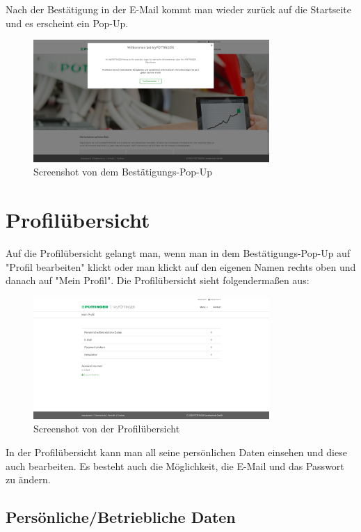 Nach der Bestätigung in der E-Mail kommt man wieder zurück auf die Startseite und es erscheint ein Pop-Up.

\begin{figure}[H]
	\centerline{
		\includegraphics[width=0.8\textwidth]{./grafiken/erm_home_after_email.png}
	}
	\vskip0pt
	\caption{Screenshot von dem Bestätigungs-Pop-Up} \label{fig:popup}
\end{figure}

\section{Profilübersicht}

Auf die Profilübersicht gelangt man, wenn man in dem Bestätigungs-Pop-Up auf "Profil bearbeiten" klickt oder man klickt auf den eigenen Namen rechts oben und danach auf "Mein Profil". Die Profilübersicht sieht folgendermaßen aus:

\begin{figure}[H]
	\centerline{
		\includegraphics[width=0.8\textwidth]{./grafiken/erm_profil.png}
	}
	\vskip0pt
	\caption{Screenshot von der Profilübersicht} \label{fig:profil}
\end{figure}

In der Profilübersicht kann man all seine persönlichen Daten einsehen und diese auch bearbeiten. Es besteht auch die Möglichkeit, die E-Mail und das Passwort zu ändern.

\subsection{Persönliche/Betriebliche Daten}

